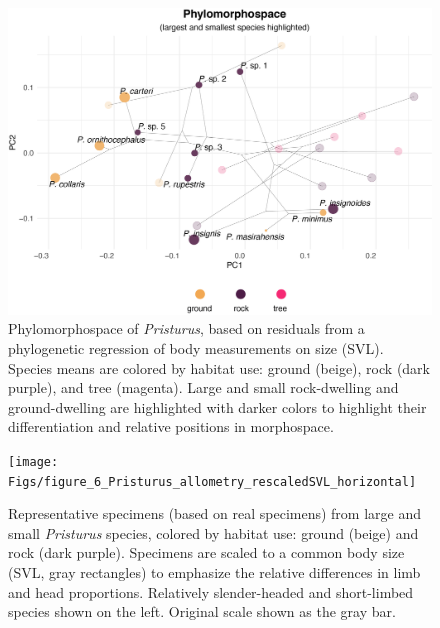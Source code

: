 \documentclass[
  11pt,
]{article}
\begin{document}
\begin{figure}

{\centering \includegraphics[width=1\linewidth]{Figs/figure_5_phylomorphospace_large_small} 

}

\caption{Phylomorphospace of \textit{Pristurus}, based on residuals from a phylogenetic regression of body measurements on size (SVL). Species means are colored by habitat use: ground (beige), rock (dark purple), and tree (magenta). Large and small rock-dwelling and ground-dwelling are highlighted with darker colors to highlight their differentiation and relative positions in morphospace.}\label{fig:unnamed-chunk-8}
\end{figure}

\newpage

\begin{figure}

{\centering \texttt{[image: Figs/figure\_6\_Pristurus\_allometry\_rescaledSVL\_horizontal]} 

}

\caption{Representative specimens (based on real specimens) from large and small \textit{Pristurus} species, colored by habitat use: ground (beige) and rock (dark purple). Specimens are scaled to a common body size (SVL, gray rectangles) to emphasize the relative differences in limb and head proportions. Relatively slender-headed and short-limbed species shown on the left. Original scale shown as the gray bar.}\label{fig:unnamed-chunk-9}
\end{figure}
\end{document}
